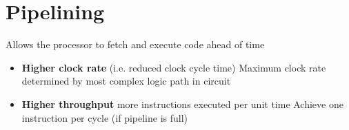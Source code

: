 \section{Pipelining}
Allows the processor to fetch and execute code ahead of time
\begin{itemize}
	\item\textbf{Higher clock rate} (i.e. reduced clock cycle time)
	\subitem Maximum clock rate determined by most complex logic path in circuit
	\item\textbf{Higher throughput} more instructions executed per unit time
	\subitem Achieve one instruction per cycle (if pipeline is full)	
\end{itemize}
